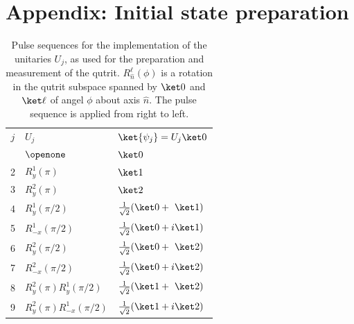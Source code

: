\documentclass[
aps,prl,
reprint,
a4paper,
superscriptaddress,
floatfix,
]{revtex4-1}
\begin{document}
\section{Appendix: Initial state preparation}
\begin{table}[h]
\centering
\begin{ruledtabular}
\begin{tabular}{cll}
$j$ & $U_j$ & $\ket{\psi_j} = U_j\ket0$ \\
\colrule
1 & $\openone$ & $\ket0$ \\
2 & $R^1_y(\pi)$ & $\ket1$ \\
3 & $R^2_y(\pi)$ & $\ket2$ \\
4 & $R^1_y(\pi/2)$ & $\frac{1}{\sqrt{2}}(\ket0+\phantom{i}\ket1)$ \\
5 & $R^1_{-x}(\pi/2)$ & $\frac{1}{\sqrt{2}}(\ket0+i\ket1)$ \\
6 & $R^2_y(\pi/2)$ & $\frac{1}{\sqrt{2}}(\ket0+\phantom{i}\ket2)$ \\
7 & $R^2_{-x}(\pi/2)$ & $\frac{1}{\sqrt{2}}(\ket0+i\ket2)$ \\
8 & $R^2_y(\pi) R^1_y(\pi/2)$ & $\frac{1}{\sqrt{2}}(\ket1+\phantom{i}\ket2)$ \\
9 & $R^2_{y}(\pi) R^1_{-x}(\pi/2)$ & $\frac{1}{\sqrt{2}}(\ket1+i\ket2)$ \\
\end{tabular}
\end{ruledtabular}
\caption{\label{tab:tomography}%
Pulse sequences for the implementation of the unitaries $U_j$, as used for the 
 preparation and measurement of the qutrit.
$R^{\ell}_{\hat{n}}(\phi)$ is a rotation in the qutrit subspace spanned by 
 $\ket0$ and $\ket\ell$ of angel $\phi$ about axis $\hat{n}$.
The pulse sequence is applied from right to left.}
\end{table}
\end{document}
